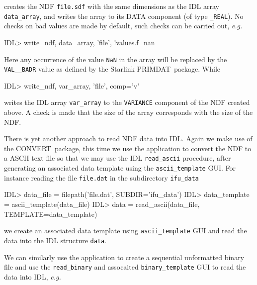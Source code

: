 \documentclass[twoside,11pt]{starlink}
\providecommand{\CONVERT}{{\footnotesize CONVERT}\normalsize}
\begin{document}
creates the NDF \texttt{file.sdf} with the same dimensions as the IDL
array \texttt{data\_array}, and writes the array to its DATA component
(of type \texttt{\_REAL}).  No checks on bad values are made by default,
such checks can be carried out, \emph{e.g.}\

\begin{small}
\begin{terminalv}
IDL> write_ndf, data_array, 'file', !values.f_nan
\end{terminalv}
\end{small}

Here any occurrence of the value \texttt{NaN} in the array will be
replaced by the \texttt{VAL\_\_BADR} value as defined by the Starlink
{\footnotesize PRIMDAT}\normalsize\ package.  While

\begin{small}
\begin{terminalv}
IDL> write_ndf, var_array, 'file', comp='v'
\end{terminalv}
\end{small}

writes the IDL array \texttt{var\_array} to the \texttt{VARIANCE} component
of the NDF created above.  A check is made that the size of the array
corresponds with the size of the NDF.

There is yet another approach to read NDF data into IDL.  Again we
make use of the \CONVERT\ package, this time we use the  application to convert the NDF to a
ASCII text file so that we may use the IDL \texttt{read\_ascii}
procedure, after generating an associated data template using the \texttt{ascii\_template} GUI.  For instance reading the file \texttt{file.dat} in
the subdirectory \texttt{ifu\_data}

\begin{small}
\begin{terminalv}
IDL> data_file = filepath('file.dat', SUBDIR='ifu_data')
IDL> data_template = ascii_template(data_file)
IDL> data = read_ascii(data_file, TEMPLATE=data_template)
\end{terminalv}
\end{small}

we create an associated data template using \texttt{ascii\_template} GUI
and read the data into the IDL structure \texttt{data}.

We can similarly use the 
application to create a sequential unformatted binary file and use the
\texttt{read\_binary} and assocaited \texttt{binary\_template} GUI to read
the data into IDL, \emph{e.g.}
\end{document}
